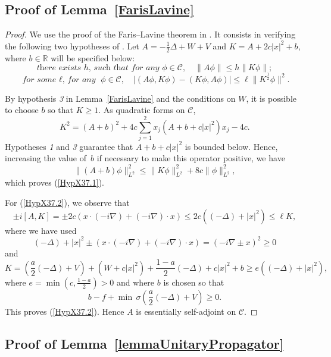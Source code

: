 \documentclass[a4paper,11pt]{article}
\theoremstyle{plain}
\theoremstyle{remark}
\def\R{{\mathbb R}}
\begin{document}
\subsection{Proof of Lemma~\ref{FarisLavine}}\label{sec:FL_lemma}
\begin{proof}
We use the proof of the Faris--Lavine theorem in \cite{ReedSimon2}. It consists in verifying the following two hypotheses of \cite[Theorem X.37]{ReedSimon2}.  Let $A = -\frac12\Delta + W+V$ and $K=A+2c|x|^2 +b$, where $b\in\R$ will be specified below:
\begin{equation}
\label{HypX37.1}\textit{there exists $h$, such that for any } \phi \in \mathcal{C},
\quad \|A\phi\|\leq h \|K\phi\|;
\end{equation}
\begin{equation}
\label{HypX37.2}
\textit{for some $\ell$, for any }  \phi \in \mathcal{C},\quad |(A\phi,K\phi) - (K\phi,A\phi)| \leq \ell \|K^\frac{1}{2} \phi\|^2.
\end{equation}

By hypothesis \textit{3} in Lemma~\ref{FarisLavine} and the conditions on $W$, it is possible to choose $b$ so that $K\geq 1$.
As quadratic forms on $\mathcal{C}$,
\[K^2 = (A+b)^2 + 4c \sum_{j=1}^2 x_j (A+b+c|x|^2)x_j - 4c.  \]
Hypotheses \textit{1} and \textit{3} guarantee that $A+b+c|x|^2$ is bounded below.
Hence, increasing the value of~$b$ if necessary to make this operator positive, we have
\[ \|(A+b)\phi\|^2_{L^2} \leq \|K\phi \|^2_{L^2} +8c\|\phi \|^2_{L^2},\]
which proves (\ref{HypX37.1}).

\medskip

For (\ref{HypX37.2}), we observe that
\[ \pm i [A,K] = \pm 2c(x \cdot (-i\nabla) + (-i\nabla)\cdot x) \leq 2 c \left((-\Delta) +|x|^2\right) \leq \ell K, \]
where we have used
\[(-\Delta) + |x|^2 \pm (x\cdot(-i\nabla) + (-i\nabla)\cdot x) = (-i\nabla  \pm x)^2 \geq 0 \]
and
\[ K = \left(\frac a 2 (-\Delta) + V\right) + (W+c|x|^2) + \frac{1-a}{2}(-\Delta) + c|x|^2 +b \geq e((-\Delta)+|x|^2), \]
where $e = \min(c,\frac{1-a}{2})>0$ and where $b$ is chosen so that
$$b- f +\min \,\sigma\left(\frac a 2 (-\Delta) + V\right) \geq 0.$$
This proves  (\ref{HypX37.2}).
Hence $A$ is essentially self-adjoint on $\mathcal{C}$.
\end{proof}

\subsection{Proof of Lemma~\ref{lemmaUnitaryPropagator}}\label{sec:unitaryprop}
\end{document}
